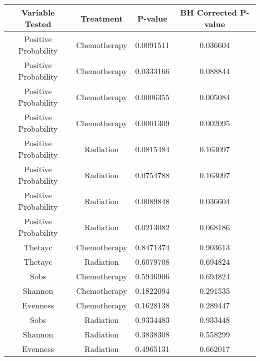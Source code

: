 \documentclass[12pt,]{article}
\begin{document}
\begin{longtable}[]{@{}cccc@{}}
\toprule
Variable Tested & Treatment & P-value & BH Corrected
P-value\tabularnewline
\midrule
\endhead
Positive Probability & Chemotherapy & 0.0091511 &
0.036604\tabularnewline
Positive Probability & Chemotherapy & 0.0333166 &
0.088844\tabularnewline
Positive Probability & Chemotherapy & 0.0006355 &
0.005084\tabularnewline
Positive Probability & Chemotherapy & 0.0001309 &
0.002095\tabularnewline
Positive Probability & Radiation & 0.0815484 & 0.163097\tabularnewline
Positive Probability & Radiation & 0.0754788 & 0.163097\tabularnewline
Positive Probability & Radiation & 0.0089848 & 0.036604\tabularnewline
Positive Probability & Radiation & 0.0213082 & 0.068186\tabularnewline
Thetayc & Chemotherapy & 0.8471374 & 0.903613\tabularnewline
Thetayc & Radiation & 0.6079708 & 0.694824\tabularnewline
Sobs & Chemotherapy & 0.5946906 & 0.694824\tabularnewline
Shannon & Chemotherapy & 0.1822094 & 0.291535\tabularnewline
Evenness & Chemotherapy & 0.1628138 & 0.289447\tabularnewline
Sobs & Radiation & 0.9334483 & 0.933448\tabularnewline
Shannon & Radiation & 0.3838308 & 0.558299\tabularnewline
Evenness & Radiation & 0.4965131 & 0.662017\tabularnewline
\bottomrule
\end{longtable}
\end{document}
